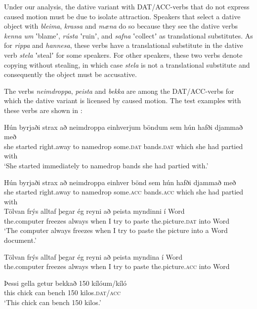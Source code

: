 \documentclass[output=paper,modfonts,nonflat,colorlinks,citecolor=brown]{langsci/langscibook}
\begin{document}
Under our analysis, the dative variant with DAT/ACC-verbs that do not express caused motion must be due to isolate attraction. Speakers that select a dative object with \textit{bleima}, \textit{krassa} and \textit{mæna} do so because they see the dative verbs \textit{kenna} \textit{um} ʽblameʼ, \textit{rústa} ʽruinʼ, and \textit{safna} ʽcollectʼ as translational substitutes. As for \textit{rippa} and \textit{hannesa}, these verbs have a translational substitute in the dative verb \textit{stela} ʽstealʼ for some speakers. For other speakers, these two verbs denote copying without stealing, in which case \textit{stela} is not a translational substitute and consequently the object must be accusative. 

The verbs \textit{neimdroppa}, \textit{peista} and \textit{bekka} are among the DAT/ACC-verbs for which the dative variant is licensed by caused motion. The test examples with these verbs are shown in :

 
\ea%
\label{ex:jonsson:7}
\ea\label{ex:jonsson:7a} 
\gll  Hún  byrjaði  strax  að  neimdroppa  einhverjum  böndum  sem  hún  hafði  djammað  með\\
   she  started  right.away  to  namedrop  some.\textsc{dat}  bands.\textsc{dat}  which  she  had  partied  with\\
\glt `She started immediately to namedrop bands she had partied with.'
 
 
\ex\label{ex:jonsson:7b}
\gll   Hún  byrjaði  strax  að  neimdroppa  einhver  bönd  sem  hún  hafði  djammað  með\\
 she  started  right.away  to  namedrop  some.\textsc{acc}  bands.\textsc{acc}  which  she  had  partied  with\\
 
 
\ex\label{ex:jonsson:7c}
\gll   Tölvan  frýs  alltaf  þegar  ég  reyni  að  peista  myndinni  í  Word  \\
 the.computer  freezes  always  when  I  try  to  paste  the.picture.\textsc{dat}  into  Word  \\
\glt `The computer always freezes when I try to paste the picture into a Word document.'
  
\ex\label{ex:jonsson:7d}
\gll   Tölvan  frýs  alltaf  þegar  ég  reyni  að  peista  myndina  í  Word\\
 the.computer  freezes  always  when  I  try  to  paste  the.picture.\textsc{acc}  into  Word\\
 

\ex\label{ex:jonsson:7e}
\gll   Þessi  gella  getur  bekkað  150  kílóum/kíló\\
 this  chick  can  bench  150  kilos.\textsc{dat/acc}\\
\glt `This chick can bench 150 kilos.'
\z
\z
\end{document}
